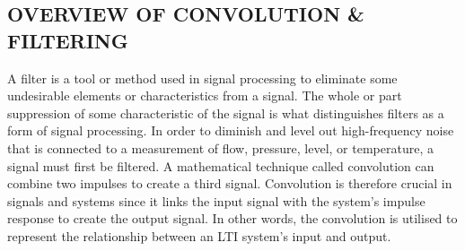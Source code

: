 \documentclass[12pt,a4paper]{article}
\begin{document}
\subsection{OVERVIEW OF CONVOLUTION \& FILTERING}
A filter is a tool or method used in signal processing to eliminate some undesirable elements or characteristics from a signal. 
The whole or part suppression of some characteristic of the signal is what distinguishes filters as a form of signal processing. 
In order to diminish and level out high-frequency noise that is connected to a measurement of flow, pressure, level, or temperature, a signal must first be filtered. 
A mathematical technique called convolution can combine two impulses to create a third signal.
Convolution is therefore crucial in signals and systems since it links the input signal with the system's impulse response to create the output signal.
In other words, the convolution is utilised to represent the relationship between an LTI system's input and output.
\newpage
\end{document}

